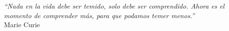 % 
% 
% 
% 
% 
% 
% 
% 

% 
% 

\thispagestyle{empty}

\begin{flushright}

  \vspace*{\fill}


  \vspace{3cm}

  \emph{``Nada en la vida debe ser temido, solo debe ser comprendido. Ahora es el momento de comprender más, para que podamos temer menos.''}\\ Marie Curie

\end{flushright}  

\vspace{4cm}
\vspace*{\fill}




